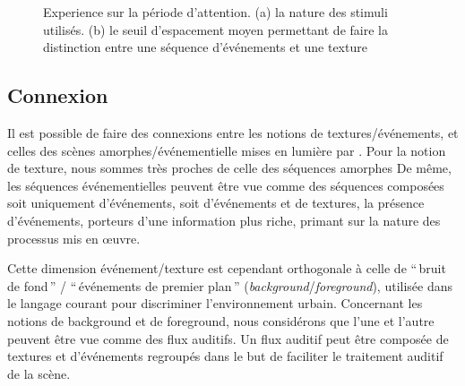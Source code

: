 \begin{figure}[bth]
        \myfloatalign
        \caption[Experience sur la période d'attention]{Experience sur la période d'attention. (a) la nature des stimuli utilisés. (b) le seuil d'espacement moyen permettant de faire la distinction entre une séquence d'événements et une texture}\label{fig:xptexture}
\end{figure}


\subsection{Connexion}


Il est possible de faire des connexions entre les notions de textures/événements, et celles des scènes amorphes/événementielle mises en lumière par \citep{maffiolo_caracterisation_1999}. Pour la notion de texture, nous sommes très proches de celle des séquences amorphes
De même, les séquences événementielles peuvent être vue comme des séquences composées soit uniquement d'événements, soit d'événements et de textures, la présence d'événements, porteurs d'une information plus riche, primant sur la nature des processus mis en œuvre. 

Cette dimension événement/texture est cependant orthogonale à celle de ``\,bruit de fond\,'' / ``\,événements de premier plan\,'' (\emph{background}/\emph{foreground}), utilisée dans le langage courant pour discriminer l’environnement urbain. Concernant les notions de background et de foreground, nous considérons que l'une et l'autre peuvent être vue comme des flux auditifs. Un flux auditif peut être composée de textures et d’événements regroupés dans le but de faciliter le traitement auditif de la scène. 

